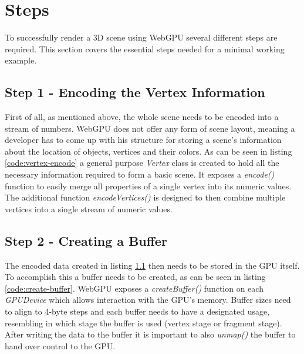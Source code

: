 \section{Steps}

To successfully render a 3D scene using WebGPU several different steps
are required. This section covers the essential steps needed for a
minimal working example.



\subsection{Step 1 - Encoding the Vertex Information}
\label{section:practical-step-1}

First of all, as mentioned above, the whole scene needs to be encoded
into a stream of numbers. WebGPU does not offer any form of scene
layout, meaning a developer has to come up with his structure for
storing a scene's information about the location of objects, vertices
and their colors. As can be seen in listing \ref*{code:vertex-encode} a
general purpose \emph{Vertex} class is created to hold all the necessary
information required to form a basic scene. It exposes a
\emph{encode()} function to easily merge all properties of a single
vertex into its numeric values. The additional function
\emph{encodeVertices()} is designed to then combine multiple vertices
into a single stream of numeric values. 

\begin{samepage}
   { An exemplary illustration
    of how to encode vertex information for use in WebGPU
    }}, language=TypeScript, firstnumber=1, label=code:vertex-encode ]
    {listings/vertex.ts}
\end{samepage}


\subsection{Step 2 - Creating a Buffer}

The encoded data created in listing \ref*{section:practical-step-1} then
needs to be stored in the GPU itself. To accomplish this a buffer needs
to be created, as can be seen in listing \ref*{code:create-buffer}.
WebGPU exposes a \emph{createBuffer()} function on each \emph{GPUDevice}
which allows interaction with the GPU's memory. Buffer sizes need to
align to 4-byte steps and each buffer needs to have a designated usage,
resembling in which stage the buffer is used (vertex stage or fragment
stage). After writing the data to the buffer it is important to also
\emph{unmap()} the buffer to hand over control to the GPU. 

